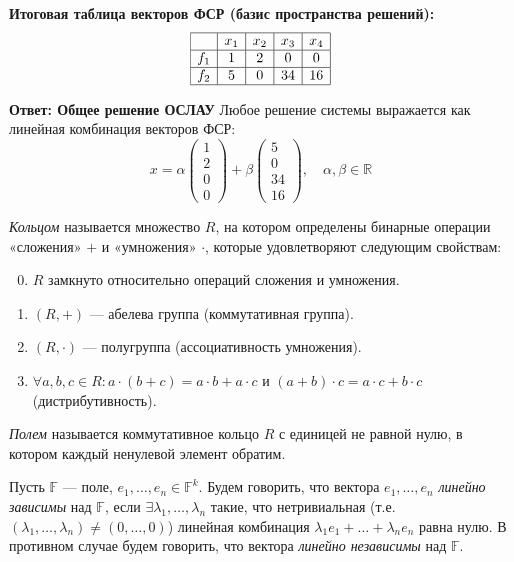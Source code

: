 \noindent
\textbf{Итоговая таблица векторов ФСР (базис пространства решений):}
\[
\begin{array}{|c|c|c|c|c|}
\hline
    & x_1 & x_2 & x_3 & x_4 \\ \hline
f_1 &  1  &  2  &  0  &  0  \\ \hline
f_2 &  5  &  0  &  34 &  16 \\ \hline
\end{array}
\]

\noindent
\textbf{Ответ: Общее решение ОСЛАУ}
Любое решение системы выражается как линейная комбинация векторов ФСР:
\[
x = \alpha \begin{pmatrix} 1 \\ 2 \\ 0 \\ 0 \end{pmatrix} 
+ \beta \begin{pmatrix} 5 \\ 0 \\ 34 \\ 16 \end{pmatrix}, 
\quad \alpha, \beta \in \mathbb{R}
\]

\begin{definition}
\textit{Кольцом} называется множество $R$, на котором определены бинарные операции «сложения» $+$ и «умножения» $\cdot$, которые удовлетворяют следующим свойствам:

\begin{enumerate}[label=\arabic*)]
    \setcounter{enumi}{-1} %
    \item $R$ замкнуто относительно операций сложения и умножения.
    \item $(R, +)$ — абелева группа (коммутативная группа).
    \item $(R, \cdot)$ — полугруппа (ассоциативность умножения).
    \item $\forall a, b, c \in R : a \cdot (b + c) = a \cdot b + a \cdot c$ и $(a + b) \cdot c = a \cdot c + b \cdot c$ (дистрибутивность).
\end{enumerate}
\end{definition}

\begin{definition}
    \textit{Полем} называется коммутативное кольцо $R$ с единицей не равной нулю, в котором каждый ненулевой элемент обратим.
\end{definition}

\begin{definition}
    Пусть $\mathbb{F}$ — поле, $e_1, \dots, e_n \in \mathbb{F}^k$. Будем говорить, что вектора $e_1, \dots, e_n$ \textit{линейно зависимы} над $\mathbb{F}$, если $\exists \lambda_1, \dots, \lambda_n$ такие, что нетривиальная (т.е. $(\lambda_1, \dots, \lambda_n) \neq (0, \dots, 0)$) линейная комбинация $\lambda_1 e_1 + \dots + \lambda_n e_n$ равна нулю. В противном случае будем говорить, что вектора \textit{линейно независимы} над $\mathbb{F}$.
\end{definition}

